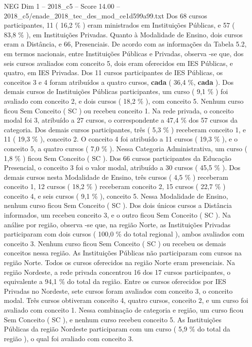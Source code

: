 \begin{textsample}{NEG Dim 1 – 2018\_c5 – Score 14.00 – 2018\_c5/enade\_2018\_tec\_des\_mod\_ce1d599a99.txt}
Dos 68 cursos participantes, 11 ( 16,2 \% ) eram ministrados em Instituições Públicas, e 57 ( 83,8 \% ), em Instituições Privadas.
Quanto à Modalidade de Ensino, dois cursos eram a Distância, e 66, Presenciais.
De acordo com as informações da Tabela 5.2, em termos nacionais, entre Instituições Públicas e Privadas, observa -se que, dos seis cursos avaliados com conceito 5, dois eram oferecidos em IES Públicas, e quatro, em IES Privadas.
Dos 11 cursos participantes de IES Públicas, os conceitos 3 e 4 foram atribuídos a quatro cursos, \textbf{cada} ( 36,4 \%, \textbf{cada} ).
Dos demais cursos de Instituições Públicas participantes, um curso ( 9,1 \% ) foi avaliado com conceito 2, e dois cursos ( 18,2 \% ), com conceito 5.
Nenhum curso ficou Sem Conceito ( SC ) ou recebeu conceito 1.
Na rede privada, o conceito modal foi 3, atribuído a 27 cursos, o correspondente a 47,4 \% dos 57 cursos da categoria.
Dos demais cursos participantes, três ( 5,3 \% ) receberam conceito 1, e 11 ( 19,3 \% ), conceito 2.
O conceito 4 foi atribuído a 11 cursos ( 19,3 \% ), e o conceito 5, a quatro cursos ( 7,0 \% ).
Nessa Categoria Administrativa, um curso ( 1,8 \% ) ficou Sem Conceito ( SC ).
Dos 66 cursos participantes da Educação Presencial, o conceito 3 foi o valor modal, atribuído a 30 cursos ( 45,5 \% ).
Dos demais cursos nesta Modalidade de Ensino, três cursos ( 4,5 \% ) receberam conceito 1, 12 cursos ( 18,2 \% ) receberam conceito 2, 15 cursos ( 22,7 \% ) conceito 4, e seis cursos ( 9,1 \% ), conceito 5.
Nessa Modalidade de Ensino, nenhum curso ficou Sem Conceito ( SC ).
Dos dois únicos cursos a Distância informados, um recebeu conceito 3, e o outro ficou Sem Conceito ( SC ).
Na análise por região, observa -se que, na região Norte, as Instituições Privadas participaram com dois cursos ( 100,0 \% do total regional ), ambos avaliados com conceito 3.
Nenhum curso ficou Sem Conceito ( SC ) ou recebeu os demais conceitos nessa região.
As Instituições Públicas não participaram com cursos na região Norte.
Todos os cursos oferecidos na região Norte eram presenciais.
Na região Nordeste, a rede privada concentrou 16 dos 17 cursos participantes, o equivalente a 94,1 \% do total da região.
Entre os cursos oferecidos por IES Privadas no Nordeste, sete cursos foram avaliados com conceito 3, o conceito modal.
Três cursos obtiveram conceito 4, quatro cursos, conceito 2, e um curso foi avaliado com conceito 1.
Nessa combinação de categoria e região, um curso ficou Sem Conceito ( SC ), e nenhum curso recebeu conceito 5.
As Instituições Públicas da região Nordeste participaram com um curso ( 5,9 \% do total da região ), o qual foi avaliado com conceito 3.

\end{textsample}
